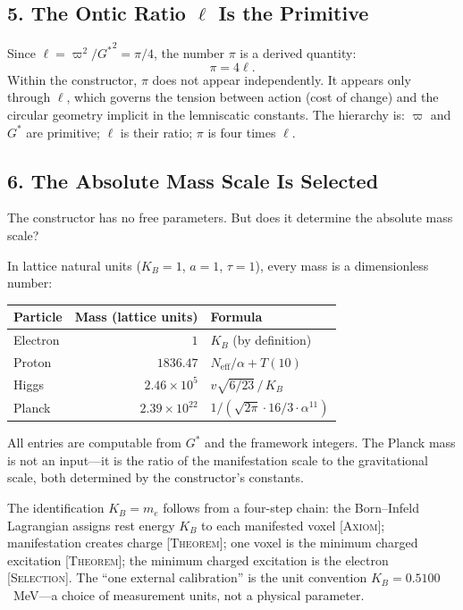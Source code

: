 \documentclass[11pt,a4paper]{article}
\newcommand{\Gstar}{{G^{*}}}
\newcommand{\vpi}{\varpi}
\newcommand{\Neff}{N_{\mathrm{eff}}}
\newcommand{\KB}{K_B}
\newcommand{\onticell}{\ell}
\newcommand{\etag}[1]{{\normalfont\textsc{\footnotesize [#1]}}}
\theoremstyle{compact}
\begin{document}
\subsection*{5. The Ontic Ratio $\onticell$ Is the Primitive}

Since $\onticell = \vpi^2/{G^*}^2 = \pi/4$, the number $\pi$ is a derived quantity:
\[
\pi = 4\onticell.
\]
Within the constructor, $\pi$ does not appear independently. It appears only through $\onticell$, which governs the tension between action (cost of change) and the circular geometry implicit in the lemniscatic constants. The hierarchy is: $\vpi$ and $\Gstar$ are primitive; $\onticell$ is their ratio; $\pi$ is four times $\onticell$.

\subsection*{6. The Absolute Mass Scale Is Selected}

The constructor has no free parameters. But does it determine the absolute mass scale?

In lattice natural units ($\KB = 1$, $a = 1$, $\tau = 1$), every mass is a dimensionless number:
\begin{center}
\begin{tabular}{lrl}
\toprule
\textbf{Particle} & \textbf{Mass (lattice units)} & \textbf{Formula} \\
\midrule
Electron & $1$ & $\KB$ (by definition) \\
Proton & $1836.47$ & $\Neff/\alpha + T(10)$ \\
Higgs & $2.46 \times 10^5$ & $v\sqrt{6/23}\,/\,\KB$ \\
Planck & $2.39 \times 10^{22}$ & $1/(\sqrt{2\pi}\cdot 16/3 \cdot \alpha^{11})$ \\
\bottomrule
\end{tabular}
\end{center}
All entries are computable from $\Gstar$ and the framework integers. The Planck mass is not an input---it is the ratio of the manifestation scale to the gravitational scale, both determined by the constructor's constants.

The identification $\KB = m_e$ follows from a four-step chain: the Born--Infeld Lagrangian assigns rest energy $\KB$ to each manifested voxel \etag{Axiom}; manifestation creates charge \etag{Theorem}; one voxel is the minimum charged excitation \etag{Theorem}; the minimum charged excitation is the electron \etag{Selection}. The ``one external calibration'' is the unit convention $\KB = 0.5100$~MeV---a choice of measurement units, not a physical parameter.
\end{document}
